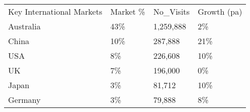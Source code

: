 \begin{tabular}[t]{p{3.5cm}p{1.1cm}p{1.3cm}p{1.2cm}}
 Key International Markets & Market \% & No\_Visits & Growth (pa) \\ 
 Australia & 43\% & 1,259,888 & 2\% \\ 
  China & 10\% &   287,888 & 21\% \\ 
  USA & 8\% &   226,608 & 10\% \\ 
  UK & 7\% &   196,000 & 0\% \\ 
  Japan & 3\% &    81,712 & 10\% \\ 
  Germany & 3\% &    79,888 & 8\% \\ 
  \end{tabular}
